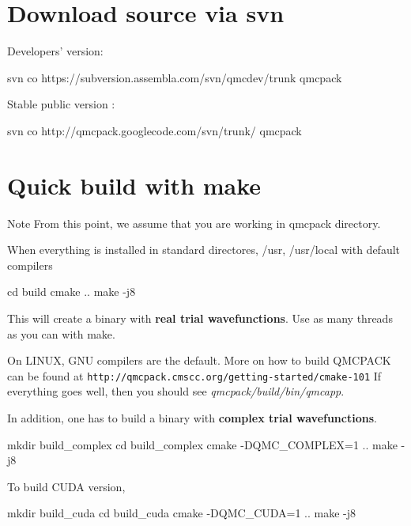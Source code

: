 \section{Download source via svn}\label{a00001_download}

\begin{DoxyItemize}
\item Developers' version\-: 
\begin{DoxyCode}
svn co https:\textcolor{comment}{//subversion.assembla.com/svn/qmcdev/trunk qmcpack}
\end{DoxyCode}

\item Stable public version \-: 
\begin{DoxyCode}
svn co http:\textcolor{comment}{//qmcpack.googlecode.com/svn/trunk/ qmcpack}
\end{DoxyCode}

\end{DoxyItemize}\section{Quick build with make}\label{a00001_quicky}
\begin{DoxyNote}{Note}
From this point, we assume that you are working in qmcpack directory.
\end{DoxyNote}
When everything is installed in standard directores, {\ttfamily /usr}, {\ttfamily /usr/local} with default compilers 
\begin{DoxyCode}
cd build
cmake ..
make -j8
\end{DoxyCode}
 This will create a binary with {\bfseries real trial wavefunctions}. Use as many threads as you can with {\ttfamily make}.

On L\-I\-N\-U\-X, G\-N\-U compilers are the default. More on how to build Q\-M\-C\-P\-A\-C\-K can be found at {\tt http\-://qmcpack.\-cmscc.\-org/getting-\/started/cmake-\/101} If everything goes well, then you should see {\itshape qmcpack/build/bin/qmcapp}.

In addition, one has to build a binary with {\bfseries complex trial wavefunctions}. 
\begin{DoxyCode}
mkdir build\_complex
cd build\_complex
cmake -DQMC\_COMPLEX=1 ..
make -j8
\end{DoxyCode}


To build C\-U\-D\-A version, 
\begin{DoxyCode}
mkdir build\_cuda
cd build\_cuda
cmake -DQMC\_CUDA=1 ..
make -j8
\end{DoxyCode}
